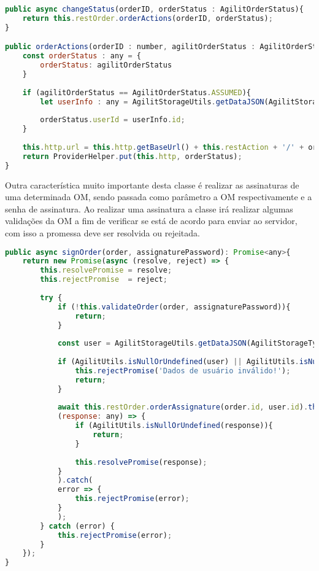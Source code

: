 \begin{lstlisting}[language=JavaScript, caption={Alterar situação da ordem de manutenção}]
public async changeStatus(orderID, orderStatus : AgilitOrderStatus){    
	return this.restOrder.orderActions(orderID, orderStatus);
}

public orderActions(orderID : number, agilitOrderStatus : AgilitOrderStatus){
	const orderStatus : any = {
		orderStatus: agilitOrderStatus        
	}
	
	if (agilitOrderStatus == AgilitOrderStatus.ASSUMED){
		let userInfo : any = AgilitStorageUtils.getDataJSON(AgilitStorageTypes.USERDATA);
		
		orderStatus.userId = userInfo.id;
	}    
	
	this.http.url = this.http.getBaseUrl() + this.restAction + '/' + orderID + '/status';
	return ProviderHelper.put(this.http, orderStatus);
}

\end{lstlisting}

Outra característica muito importante desta classe é realizar as assinaturas de uma determinada OM, sendo passada como parâmetro a OM respectivamente e a senha de assinatura. Ao realizar uma assinatura a classe irá realizar algumas validações da OM a fim de verificar se está de acordo para enviar ao servidor, com isso a promessa deve ser resolvida ou rejeitada.

\begin{lstlisting}[language=JavaScript, caption={Assinar a ordem de manutenção}]
public async signOrder(order, assignaturePassword): Promise<any>{
	return new Promise(async (resolve, reject) => {
		this.resolvePromise = resolve;
		this.rejectPromise  = reject;
		
		try {
			if (!this.validateOrder(order, assignaturePassword)){
				return;
			}        
			
			const user = AgilitStorageUtils.getDataJSON(AgilitStorageTypes.USERDATA);
			
			if (AgilitUtils.isNullOrUndefined(user) || AgilitUtils.isNullOrUndefined(user.id) || user.id == ''){
				this.rejectPromise('Dados de usuário inválido!');
				return;
			}
			
			await this.restOrder.orderAssignature(order.id, user.id).then(
			(response: any) => {
				if (AgilitUtils.isNullOrUndefined(response)){
					return;
				}
				
				this.resolvePromise(response);
			}
			).catch(
			error => {
				this.rejectPromise(error);
			}
			);
		} catch (error) {
			this.rejectPromise(error);
		}
	});
}
\end{lstlisting}

